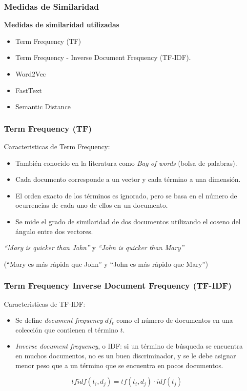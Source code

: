 \begin{frame}
	\frametitle{Medidas de Similaridad}
	\textbf{Medidas de similaridad utilizadas}
	\bigskip
	\begin{itemize}[<*>]
		\item Term Frequency (TF)
		\item Term Frequency - Inverse Document Frequency (TF-IDF).
		\item Word2Vec
		\item FastText
		\item Semantic Distance
	\end{itemize}
\end{frame}

\begin{frame}
	\frametitle{Term Frequency (TF)}
	Caracteristicas de Term Frequency:
	\bigskip
	\begin{itemize}[<*>]
		\item También conocido en la literatura como \textit{Bag of words} (bolsa de palabras).
		\item Cada documento corresponde a un vector y cada término a una dimensión.
		\item El orden exacto de los términos es ignorado, pero se basa en el número de ocurrencias de cada uno de ellos en un documento.
		\item Se mide el grado de similaridad de dos documentos utilizando el coseno del ángulo entre dos vectores.
	\end{itemize}

	\bigskip
	\centering
	\textit{“Mary is quicker than John”} y \textit{“John is quicker than Mary”} \\
	\medskip
	\begin{scriptsize}
		(``Mary es más rápida que John'' y ``John es más rápido que Mary'')
	\end{scriptsize}
\end{frame}

\begin{frame}
	\frametitle{Term Frequency Inverse Document Frequency (TF-IDF)}
	Caracteristicas de TF-IDF:
	\bigskip
	\begin{itemize}[<*>]
		\item Se define \textit{document frequency} \(df_t\) como el número de documentos en una colección que contienen el término \(t\).
		\item \textit{Inverse document frequency}, o IDF: si un término de búsqueda se encuentra en muchos documentos, no es un buen discriminador, y se le debe asignar menor peso que a un término que se encuentra en pocos documentos.
	\end{itemize}

	\centering
	\[tfidf(t_i, d_j) = tf(t_i, d_j) \cdot idf(t_j)\]
\end{frame}


